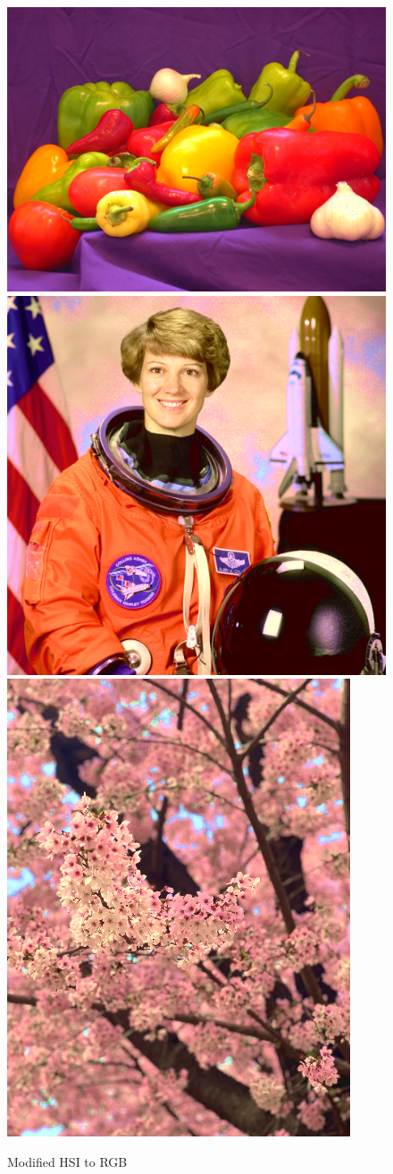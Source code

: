 \documentclass{article}
\begin{document}
\begin{figure}[!ht]
    \centering
    \includegraphics[width=.356\textwidth]{fig/HSI2RGB_peppers.png}
    \includegraphics[width=.267\textwidth]{fig/HSI2RGB_astronaut.png}
    \includegraphics[width=.2\textwidth]{fig/HSI2RGB_cb.png}
    \caption{Modified HSI to RGB}
\end{figure}
\end{document}
